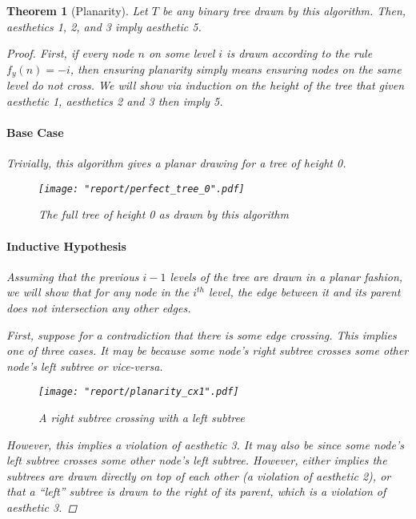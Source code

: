 \documentclass[11pt]{report}
\newtheorem{theorem}{Theorem}[section]
\begin{document}
\begin{theorem}[Planarity]
    \label{tree_lp_planar}
    Let $T$ be any binary tree drawn by this algorithm. Then, aesthetics 1, 2, and 3 imply aesthetic 5.
    
    \begin{proof}
        First, if every node $n$ on some level $i$ is drawn according to the rule $f_y(n) = -i$, then ensuring planarity simply means ensuring nodes on the same level do not cross. We will show via induction on the height of the tree that given aesthetic 1, aesthetics 2 and 3 then imply 5.
        
        \bigskip
        
        \paragraph{Base Case} Trivially, this algorithm gives a planar drawing for a tree of height 0.
        
        \begin{figure}[H]
            \centering
            \texttt{[image: "report/perfect\_tree\_0".pdf]}
            \caption{The full tree of height 0 as drawn by this algorithm}
        \end{figure}
        
        \paragraph{Inductive Hypothesis} Assuming that the previous $i - 1$ levels of the tree are drawn in a planar fashion, we will show that for any node in the $i^{th}$ level, the edge between it and its parent does not intersection any other edges.
        
        \bigskip
        
        First, suppose for a contradiction that there is some edge crossing. This implies one of three cases. It may be because some node's right subtree crosses some other node's left subtree or vice-versa.
        
        \begin{figure}[H]
            \centering
            \texttt{[image: "report/planarity\_cx1".pdf]}
            \caption{A right subtree crossing with a left subtree}
        \end{figure}
        
        However, this implies a violation of aesthetic 3. It may also be since some node's left subtree crosses some other node's left subtree. However, either implies the subtrees are drawn directly on top of each other (a violation of aesthetic 2), or that a ``left'' subtree is drawn to the right of its parent, which is a violation of aesthetic 3.
        

\end{proof}
\end{theorem}
\end{document}
